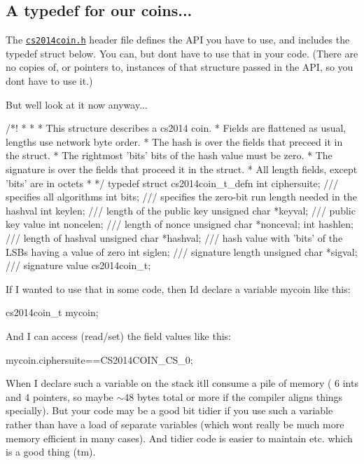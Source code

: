 \subsection*{A typedef for our coins...}

The \href{./cs2014coin.h}{\tt cs2014coin.\+h} header file defines the A\+PI you have to use, and includes the {\ttfamily typedef struct} below. You can, but don\textquotesingle{}t have to use that in your code. (There are no copies of, or pointers to, instances of that structure passed in the A\+PI, so you don\textquotesingle{}t have to use it.)

But we\textquotesingle{}ll look at it now anyway... \begin{DoxyVerb}    /*!
     *       * 
     * This structure describes a cs2014 coin.
     * Fields are flattened as usual, lengths use network byte order.
     * The hash is over the fields that preceed it in the struct.
     * The rightmost 'bits' bits of the hash value must be zero.
     * The signature is over the fields that proceed it in the struct.
     * All length fields, except 'bits' are in octets
     *
     */
    typedef struct cs2014coin_t_defn {
        int ciphersuite; /// specifies all algorithms 
        int bits; /// specifies the zero-bit run length needed in the hashval
        int keylen; /// length of the public key
        unsigned char *keyval; /// public key value
        int noncelen; /// length of nonce
        unsigned char *nonceval;
        int hashlen; /// length of hashval
        unsigned char *hashval; /// hash value with 'bits' of the LSBs having a value of zero 
        int siglen; /// signature length
        unsigned char *sigval; /// signature value
    } cs2014coin_t;
\end{DoxyVerb}


If I wanted to use that in some code, then I\textquotesingle{}d declare a variable {\ttfamily mycoin} like this\+: \begin{DoxyVerb}    cs2014coin_t mycoin;
\end{DoxyVerb}


And I can access (read/set) the field values like this\+: \begin{DoxyVerb}    mycoin.ciphersuite==CS2014COIN_CS_0;
\end{DoxyVerb}


When I declare such a variable on the stack it\textquotesingle{}ll consume a pile of memory ( 6 ints and 4 pointers, so maybe $\sim$48 bytes total or more if the compiler aligns things specially). But your code may be a good bit tidier if you use such a variable rather than have a load of separate variables (which won\textquotesingle{}t really be much more memory efficient in many cases). And tidier code is easier to maintain etc. which is a good thing (tm).

